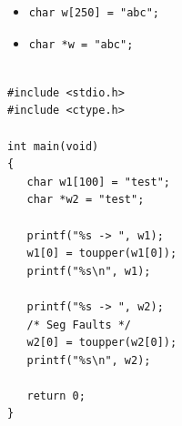 \documentclass[a4,portraitt]{slides}
\begin{document}
\newpage
{\samepage
\begin{itemize}
\item \begin{verbatim}
char w[250] = "abc";
\end{verbatim}
\item \begin{verbatim}
char *w = "abc";
\end{verbatim}
\end{itemize}
\begin{verbatim}

#include <stdio.h>
#include <ctype.h>

int main(void)
{
   char w1[100] = "test";
   char *w2 = "test";

   printf("%s -> ", w1);
   w1[0] = toupper(w1[0]);
   printf("%s\n", w1);

   printf("%s -> ", w2);
   /* Seg Faults */
   w2[0] = toupper(w2[0]);
   printf("%s\n", w2);

   return 0;
}
\end{verbatim}
}
\end{document}

